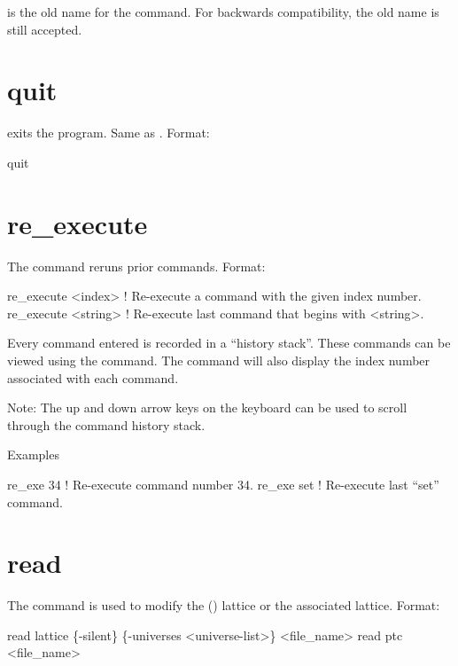  is the old name for the  command. For backwards compatibility,
the old name is still accepted.

\section{quit}
\label{s:quit}

 exits the program. Same as .
Format:
\begin{example}
  quit
\end{example}

\section{re_execute}
\label{s:re.exe}

The  command reruns prior commands.  Format:
\begin{example}
  re_execute <index>   ! Re-execute a command with the given index number.
  re_execute <string>  ! Re-execute last command that begins with <string>.
\end{example}

\vskip 10pt 

Every \tao command entered is recorded in a ``history stack''. These commands can be viewed using
the  command. The  command will also display the index number
associated with each command.

Note: The up and down arrow keys on the keyboard can be used to scroll through the command history
stack.

Examples
\begin{example}
  re_exe 34   ! Re-execute command number 34.
  re_exe set  ! Re-execute last ``set'' command.  
\end{example}

\section{read}
\label{s:read}

The  command is used to modify the (\bmad)  lattice or the associated 
lattice. Format:
\begin{example}
  read lattice \{-silent\} \{-universes <universe-list>\} <file_name>
  read ptc <file_name>
\end{example}

